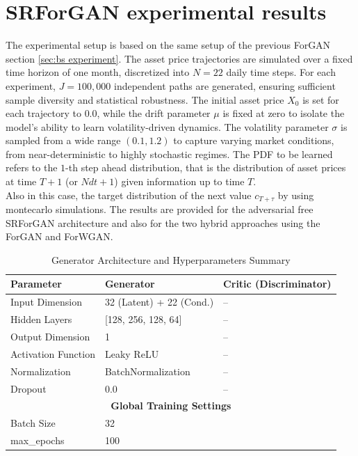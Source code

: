 
\section{SRForGAN experimental results}

The experimental setup is based on the same setup of the previous ForGAN section \ref{sec:bs experiment}.
The asset price trajectories are simulated over a fixed time horizon of one month, discretized into $N=22$ daily time steps.
For each experiment, $J=100{,}000$ independent paths are generated, ensuring sufficient sample diversity and statistical robustness.
The initial asset price $X_0$ is set for each trajectory to $0.0$, while the drift parameter $\mu$ is fixed at zero to isolate the model's ability to learn volatility-driven dynamics.
The volatility parameter $\sigma$ is sampled from a wide range $(0.1, 1.2)$ to capture varying market conditions, from near-deterministic to highly stochastic regimes.
The PDF to be learned refers to the $1$-th step ahead distribution, that is the distribution of asset prices at time $T + 1$ (or $N dt + 1$) given information up to time $T$.\\

Also in this case, the target distribution of the next value $c_{T + \tau}$  by using montecarlo simulations. 
The results are provided for the adversarial free SRForGAN architecture and also for the two 
hybrid approaches using the ForGAN and ForWGAN.\\



\begin{table}[H]
\centering
\caption{Generator Architecture and Hyperparameters Summary}
\label{tab:srforgan_architecture}
\begin{tabular}{lll}
\hline
\textbf{Parameter}         & \textbf{Generator}                  & \textbf{Critic (Discriminator)} \\ \hline
Input Dimension            & 32 (Latent) + 22 (Cond.)           & --                              \\
Hidden Layers              & [128, 256, 128, 64]                & --                              \\
Output Dimension           & 1                                  & --                              \\
Activation Function        & Leaky ReLU                         & --                              \\
Normalization              & BatchNormalization                 & --                              \\
Dropout                    & 0.0                                & --                              \\
\multicolumn{3}{c}{\textbf{Global Training Settings}}                                      \\ \hline
Batch Size                 & \multicolumn{2}{l}{32}                                            \\
max\_epochs                & \multicolumn{2}{l}{100}                                          \\
\hline
\end{tabular}
\end{table}


